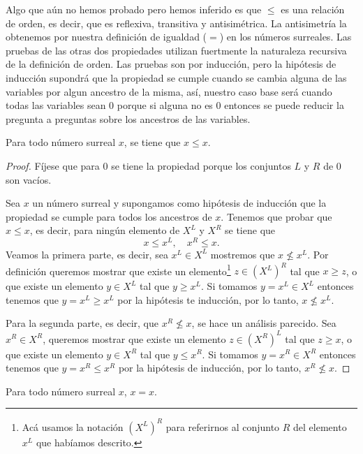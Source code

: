     Algo que a\'un no hemos probado pero hemos inferido es que $\le$ es una relaci\'on de orden, es decir, que es reflexiva, transitiva y antisim\'etrica. La antisimetr\'ia la obtenemos por nuestra definici\'on de igualdad ($=$) en los n\'umeros surreales. Las pruebas de las otras dos propiedades utilizan fuertmente la naturaleza recursiva de la definici\'on de orden. Las pruebas son por inducci\'on, pero la hip\'otesis de inducci\'on supondr\'a que la propiedad se cumple cuando se cambia alguna de las variables por algun ancestro de la misma, as\'i, nuestro caso base ser\'a cuando todas las variables sean $0$ porque si alguna no es $0$ entonces se puede reducir la pregunta a preguntas sobre los ancestros de las variables.

    \begin{theorem}[Reflexividad]
        Para todo n\'umero surreal $x$, se tiene que $x\le x$.
    \end{theorem}

    \begin{proof}
        F\'ijese que para $0$ se tiene la propiedad porque los conjuntos $L$ y $R$ de $0$ son vac\'ios.

        Sea $x$ un n\'umero surreal y supongamos como hip\'otesis de inducci\'on que la propiedad se cumple para todos los ancestros de $x$. Tenemos que probar que $x\le x$, es decir, para ning\'un elemento de $X^L$ y $X^R$ se tiene que
        \[
            x \le x^L, \quad x^R \le x.
        \]
        Veamos la primera parte, es decir, sea $x^L\in X^L$ mostremos que $x \not\le x^L$. Por definici\'on queremos mostrar que existe un elemento\footnote{Ac\'a usamos la notaci\'on $(X^L)^R$ para referirnos al conjunto $R$ del elemento $x^L$ que hab\'iamos descrito.} $z\in (X^L)^R$  tal que $x \ge z$, o que existe un elemento $y \in X^L$ tal que $y \ge x^L$. Si tomamos $y = x^L \in X^L$ entonces tenemos que $y = x^L \ge x^L$ por la hip\'otesis te inducci\'on, por lo tanto, $x\not\le x^L$.

        Para la segunda parte, es decir, que $x^R \not\le x$, se hace un an\'alisis parecido. Sea $x^R\in X^R$, queremos mostrar que existe un elemento $z\in (X^R)^L$ tal que $z \ge x$, o que existe un elemento $y\in X^R$ tal que $y \le x^R$. Si tomamos $y = x^R\in X^R$ entonces tenemos que $y = x^R \le x^R$ por la hip\'otesis de inducci\'on, por lo tanto, $x^R \not\le x$.
    \end{proof}
    
    \begin{corollary}
        Para todo n\'umero surreal $x$, $x = x$.
    \end{corollary}

